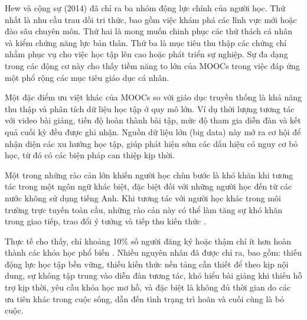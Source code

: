 Hew và cộng sự (2014) \cite{hew2014students} đã chỉ ra ba nhóm động lực chính của người học. Thứ nhất là nhu cầu trau dồi tri thức, bao gồm việc khám phá các lĩnh vực mới hoặc đào sâu chuyên môn. Thứ hai là mong muốn chinh phục các thử thách cá nhân và kiểm chứng năng lực bản thân. Thứ ba là mục tiêu thu thập các chứng chỉ nhằm phục vụ cho việc học tập lên cao hoặc phát triển sự nghiệp. Sự đa dạng trong các động cơ này cho thấy tiềm năng to lớn của MOOCs trong việc đáp ứng một phổ rộng các mục tiêu giáo dục cá nhân.

Một đặc điểm ưu việt khác của MOOCs so với giáo dục truyền thống là khả năng thu thập và phân tích dữ liệu học tập ở quy mô lớn. Ví dụ thời lượng tương tác với video bài giảng, tiến độ hoàn thành bài tập, mức độ tham gia diễn đàn và kết quả cuối kỳ đều được ghi nhận. Nguồn dữ liệu lớn (big data) này mở ra cơ hội để nhận diện các xu hướng học tập, giúp phát hiện sớm các dấu hiệu có nguy cơ bỏ học, từ đó có các biện pháp can thiệp kịp thời.

Một trong những rào cản lớn khiến người học chùn bước là khó khăn khi tương tác trong một ngôn ngữ khác biệt, đặc biệt đối với những người học đến từ các nước không sử dụng tiếng Anh. Khi tương tác với người học khác trong môi trường trực tuyến toàn cầu, những rào cản này có thể làm tăng sự khó khăn trong giao tiếp, trao đổi ý tưởng và tiếp thu kiến thức \cite{ma2023leveraging}.

Thực tế cho thấy, chỉ khoảng 10\% số người đăng ký hoặc thậm chí ít hơn hoàn thành các khóa học phổ biến \cite{hew2014students}. Nhiều nguyên nhân đã được chỉ ra, bao gồm: thiếu động lực học tập bền vững, thiếu kiến thức nền tảng cần thiết để theo kịp nội dung, sự không tập trung vào diễn đàn tương tác, khó hiểu bài giảng khi thiếu hỗ trợ kịp thời, yêu cầu khóa học mơ hồ, và đặc biệt là không đủ thời gian do các ưu tiên khác trong cuộc sống, dẫn đến tình trạng trì hoãn và cuối cùng là bỏ cuộc.

